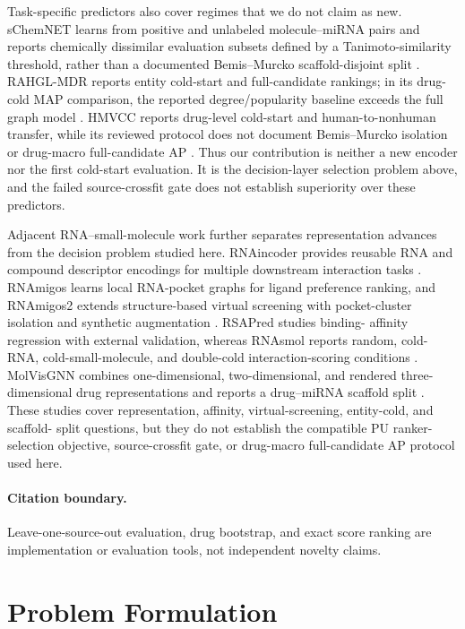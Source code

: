 \documentclass[preprint,review,12pt]{elsarticle}
\begin{document}
Task-specific predictors also cover regimes that we do not claim as new.
sChemNET learns from positive and unlabeled molecule--miRNA pairs and reports
chemically dissimilar evaluation subsets defined by a Tanimoto-similarity
threshold, rather than a documented Bemis--Murcko scaffold-disjoint split
\citep{galeano2024schemnet}. RAHGL-MDR reports entity cold-start and
full-candidate rankings; in its drug-cold MAP comparison, the reported
degree/popularity baseline exceeds the full graph model
\citep{elbashir2026rahgl}. HMVCC reports drug-level cold-start and
human-to-nonhuman transfer, while its reviewed protocol does not document
Bemis--Murcko isolation or drug-macro full-candidate AP
\citep{ma2027hmvcc}. Thus our contribution is neither a new encoder nor the
first cold-start evaluation. It is the decision-layer selection problem above,
and the failed source-crossfit gate does not establish superiority over these
predictors.

Adjacent RNA--small-molecule work further separates representation advances
from the decision problem studied here. RNAincoder provides reusable RNA and
compound descriptor encodings for multiple downstream interaction tasks
\citep{wang2023rnaincoder}. RNAmigos learns local RNA-pocket graphs for ligand
preference ranking, and RNAmigos2 extends structure-based virtual screening
with pocket-cluster isolation and synthetic augmentation
\citep{oliver2020rnamigos,carvajalpatino2025rnamigos2}. RSAPred studies binding-
affinity regression with external validation, whereas RNAsmol reports random,
cold-RNA, cold-small-molecule, and double-cold interaction-scoring conditions
\citep{krishnan2024rsapred,ma2025rnasmol}. MolVisGNN combines one-dimensional,
two-dimensional, and rendered three-dimensional drug representations and
reports a drug--miRNA scaffold split \citep{zhang2026molvisgnn}. These studies
cover representation, affinity, virtual-screening, entity-cold, and scaffold-
split questions, but they do not establish the compatible PU ranker-selection
objective, source-crossfit gate, or drug-macro full-candidate AP protocol used
here.

\paragraph{Citation boundary.}
Leave-one-source-out evaluation,
drug bootstrap, and exact score ranking are implementation or evaluation tools,
not independent novelty claims.

\section{Problem Formulation}
\end{document}
